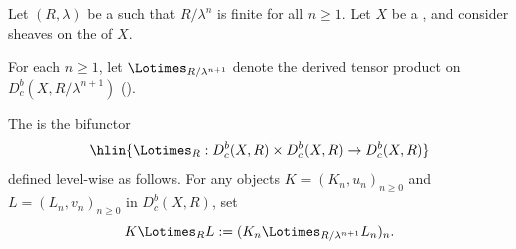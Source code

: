 \begin{definition} \label{definition:derived_tensor_product_on_bdd_constructible_complexes_with_integral_coefficients_on_a_noetherian_scheme}
    Let $(R, \lambda)$ be a   such that $R/\lambda^n$ is finite for all $n \geq 1$. Let $X$ be a , and consider sheaves on the  of $X$.

    For each $n \geq 1$, let $\Lotimes_{R/\lambda^{n+1}}$ denote the derived tensor product on $D_c^b(X, R/\lambda^{n+1})$ ().

    The  is the bifunctor
    $$\hlin{\Lotimes_R : D_c^b(X, R) \times D_c^b(X, R) \to D_c^b(X, R)}$$
    defined level-wise as follows. For any objects $K = (K_n, u_n)_{n \geq 0}$ and $L = (L_n, v_n)_{n \geq 0}$ in $D_c^b(X, R)$, set
    $$K \Lotimes_R L := (K_n \Lotimes_{R/\lambda^{n+1}} L_n)_n.$$
\end{definition}

